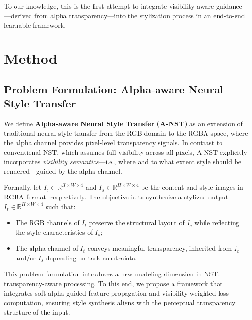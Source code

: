 \documentclass[letterpaper]{article} %
\begin{document}
To our knowledge, this is the first attempt to integrate visibility-aware guidance—derived from alpha transparency—into the stylization process in an end-to-end learnable framework.

\section{Method}

\subsection{Problem Formulation: Alpha-aware Neural Style Transfer}

We define \textbf{Alpha-aware Neural Style Transfer (A-NST)} as an extension of traditional neural style transfer from the RGB domain to the RGBA space, where the alpha channel provides pixel-level transparency signals. In contrast to conventional NST, which assumes full visibility across all pixels, A-NST explicitly incorporates \textit{visibility semantics}—i.e., where and to what extent style should be rendered—guided by the alpha channel.

Formally, let $I_c \in \mathbb{R}^{H \times W \times 4}$ and $I_s \in \mathbb{R}^{H \times W \times 4}$ be the content and style images in RGBA format, respectively. The objective is to synthesize a stylized output $I_t \in \mathbb{R}^{H \times W \times 4}$ such that:

\begin{itemize}
    \item The RGB channels of $I_t$ preserve the structural layout of $I_c$ while reflecting the style characteristics of $I_s$;
    \item The alpha channel of $I_t$ conveys meaningful transparency, inherited from $I_c$ and/or $I_s$ depending on task constraints.
\end{itemize}

This problem formulation introduces a new modeling dimension in NST: transparency-aware processing. To this end, we propose a framework that integrates soft alpha-guided feature propagation and visibility-weighted loss computation, ensuring style synthesis aligns with the perceptual transparency structure of the input.


\end{document}
